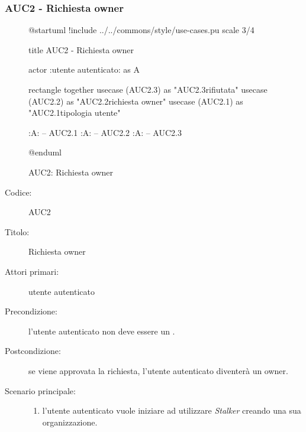 \documentclass[casi-duso]{subfiles}
\begin{document}
\subsubsection{AUC2 - Richiesta owner}%
\label{subsub:AUC2}

\begin{figure}[h!] 
  \centering 
  \begin{plantuml}
  @startuml
  !include ../../commons/style/use-cases.pu
  scale 3/4

  title AUC2 - Richiesta owner

  actor :utente autenticato: as A

  rectangle {
    together {
      usecase (AUC2.3) as "AUC2.3\nRichiesta rifiutata"
      usecase (AUC2.2) as "AUC2.2\nInvio richiesta owner"
      usecase (AUC2.1) as "AUC2.1\nVerifica tipologia utente"
    }
  }

  :A: -- AUC2.1
  :A: -- AUC2.2
  :A: -- AUC2.3

  @enduml
  \end{plantuml} 
  \caption{AUC2: Richiesta owner} 
  \label{fig:auc2} 
\end{figure}

\begin{description}
  \item[Codice:] AUC2
  \item[Titolo:] Richiesta owner
  \item[Attori primari:] utente autenticato
  \item[Precondizione:] l'utente autenticato non deve essere un .
  \item[Postcondizione:] se viene approvata la richiesta, l'utente autenticato diventerà un owner.
  \item[Scenario principale:]
  \begin{enumerate}
    \item l'utente autenticato vuole iniziare ad utilizzare \emph{Stalker} creando una sua organizzazione.
  \end{enumerate}
\end{description}
\end{document}
